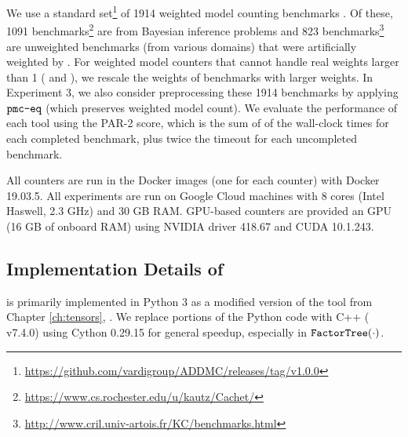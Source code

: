 We use a standard set\footnote{\url{https://github.com/vardigroup/ADDMC/releases/tag/v1.0.0}} of 1914 weighted model counting benchmarks \cite{DPV20}. Of these, 1091 benchmarks\footnote{\url{https://www.cs.rochester.edu/u/kautz/Cachet/}} are from Bayesian inference problems \cite{SBK05} and 823 benchmarks\footnote{\url{http://www.cril.univ-artois.fr/KC/benchmarks.html}} are unweighted benchmarks (from various domains) that were artificially weighted by \cite{DPV20}. For weighted model counters that cannot handle real weights larger than 1 ( and ), we rescale the weights of benchmarks with larger weights. In Experiment 3, we also consider preprocessing these 1914 benchmarks by applying $\texttt{\upshape pmc-eq}$ \cite{LM14} (which preserves weighted model count). %
We evaluate the performance of each tool using the PAR-2 score, which is the sum of of the wall-clock times for each completed benchmark, plus twice the timeout for each uncompleted benchmark.

All counters are run in the Docker images (one for each counter) with Docker 19.03.5. All experiments are run on Google Cloud  machines with 8 cores (Intel Haswell, 2.3 GHz) and 30 GB RAM. GPU-based counters are provided an  GPU (16 GB of onboard RAM) using NVIDIA driver 418.67 and CUDA 10.1.243.

\subsection{Implementation Details of }
\label{sec:experiments:impl}
 is primarily implemented in Python 3 as a modified version of the tool from Chapter \ref{ch:tensors}, . We replace portions of the Python code with C++ ( v7.4.0) using Cython 0.29.15 for general speedup, especially in $\texttt{\upshape FactorTree}(\cdot)$.

